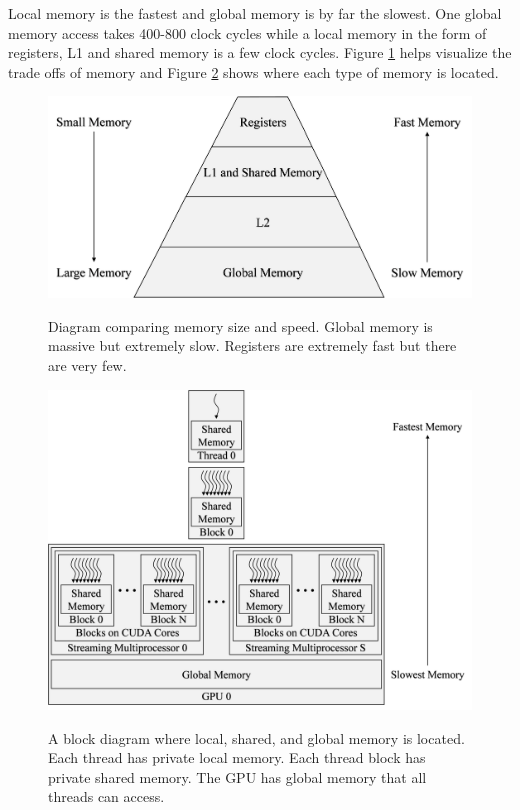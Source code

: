 Local memory is the fastest and global memory is by far the slowest.
One global memory access takes 400-800 clock cycles while a local memory in the form of registers, L1 and shared memory is a few clock cycles.
Figure \ref{fig:MemoryPyramid} helps visualize the trade offs of memory and 
Figure \ref{fig:fullGPUmemBlockDiagram} shows where each type of memory is located.
\begin{figure}
	\centering\includegraphics[width=8.36in/100*55]{figures/gpu_intro/MemoryPyramid.pdf}
	\label{fig:MemoryPyramid}
	\caption{Diagram comparing memory size and speed. Global memory is massive but extremely slow. Registers are extremely fast but there are very few.}
\end{figure}
\begin{figure}
	\centering\includegraphics[width=9.83in/100*55]{figures/gpu_intro/fullGPUmemBlockDiagram.pdf}
	\label{fig:fullGPUmemBlockDiagram}
	\caption{A block diagram where local, shared, and global memory is located. Each thread has private local memory. Each thread block has private shared memory. The GPU has global memory that all threads can access.}
\end{figure}

